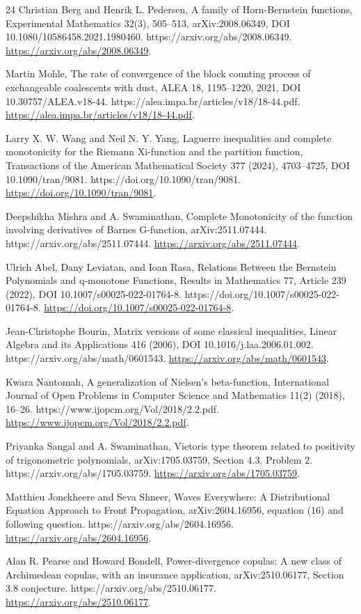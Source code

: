 \documentclass[11pt]{article}
\numberwithin{equation}{section}
\theoremstyle{definition}
\theoremstyle{remark}
\newcommand{\1}{\mathbf 1}
\begin{document}
\begin{thebibliography}{24}
Christian Berg and Henrik L. Pedersen, A family of Horn-Bernstein functions, Experimental Mathematics 32(3), 505--513, arXiv:2008.06349, DOI 10.1080/10586458.2021.1980460. https://arxiv.org/abs/2008.06349.
\url{https://arxiv.org/abs/2008.06349}.

Martin Mohle, The rate of convergence of the block counting process of exchangeable coalescents with dust, ALEA 18, 1195--1220, 2021, DOI 10.30757/ALEA.v18-44. https://alea.impa.br/articles/v18/18-44.pdf.
\url{https://alea.impa.br/articles/v18/18-44.pdf}.

Larry X. W. Wang and Neil N. Y. Yang, Laguerre inequalities and complete monotonicity for the Riemann Xi-function and the partition function, Transactions of the American Mathematical Society 377 (2024), 4703--4725, DOI 10.1090/tran/9081. https://doi.org/10.1090/tran/9081.
\url{https://doi.org/10.1090/tran/9081}.

Deepshikha Mishra and A. Swaminathan, Complete Monotonicity of the function involving derivatives of Barnes G-function, arXiv:2511.07444. https://arxiv.org/abs/2511.07444.
\url{https://arxiv.org/abs/2511.07444}.

Ulrich Abel, Dany Leviatan, and Ioan Rasa, Relations Between the Bernstein Polynomials and q-monotone Functions, Results in Mathematics 77, Article 239 (2022), DOI 10.1007/s00025-022-01764-8. https://doi.org/10.1007/s00025-022-01764-8.
\url{https://doi.org/10.1007/s00025-022-01764-8}.

Jean-Christophe Bourin, Matrix versions of some classical inequalities, Linear Algebra and its Applications 416 (2006), DOI 10.1016/j.laa.2006.01.002. https://arxiv.org/abs/math/0601543.
\url{https://arxiv.org/abs/math/0601543}.

Kwara Nantomah, A generalization of Nielsen's beta-function, International Journal of Open Problems in Computer Science and Mathematics 11(2) (2018), 16--26. https://www.ijopcm.org/Vol/2018/2.2.pdf.
\url{https://www.ijopcm.org/Vol/2018/2.2.pdf}.

Priyanka Sangal and A. Swaminathan, Vietoris type theorem related to positivity of trigonometric polynomials, arXiv:1705.03759, Section 4.3, Problem 2. https://arxiv.org/abs/1705.03759.
\url{https://arxiv.org/abs/1705.03759}.

Matthieu Jonckheere and Seva Shneer, Waves Everywhere: A Distributional Equation Approach to Front Propagation, arXiv:2604.16956, equation (16) and following question. https://arxiv.org/abs/2604.16956.
\url{https://arxiv.org/abs/2604.16956}.

Alan R. Pearse and Howard Bondell, Power-divergence copulas: A new class of Archimedean copulas, with an insurance application, arXiv:2510.06177, Section 3.8 conjecture. https://arxiv.org/abs/2510.06177.
\url{https://arxiv.org/abs/2510.06177}.

\end{thebibliography}
\end{document}
